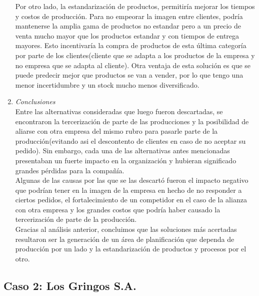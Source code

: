 \documentclass[a4paper,10pt]{article}
\begin{document}
\begin{enumerate}
Por otro lado, la estandarización de productos, permitiría mejorar los tiempos y costos de producción. Para no empeorar la imagen entre clientes, podría mantenerse la amplia gama de productos no estandar pero a un precio de venta mucho mayor que los productos estandar y con tiempos de entrega mayores. Esto incentivaría la compra de productos de esta última categoría por parte de los clientes(cliente que se adapta a los productos de la empresa y no empresa que se adapta al cliente). Otra ventaja de esta solución es que se puede predecir mejor que productos se van a vender, por lo que tengo una menor incertidumbre y un stock mucho menos diversificado.

			
			\item \textit{Conclusiones}\\
			Entre las alternativas consideradas que luego fueron descartadas, se encontraron la tercerización de parte de las producciones y la posibilidad de aliarse con otra empresa del mismo rubro para pasarle parte de la producción(evitando asi el descontento de clientes en caso de no aceptar su pedido). Sin embargo, cada una de las alternativas antes mencionadas presentaban un fuerte impacto en la organización y hubieran significado grandes pérdidas para la compañía.\\
			 Algunas de las causas por las que se las descartó fueron el impacto negativo que podrían tener en la imagen de la empresa en hecho de no responder a ciertos pedidos, el fortalecimiento de un competidor en el caso de la alianza con otra empresa y los grandes costos que podría haber causado la tercerización de parte de la producción.\\
			  Gracias al análisis anterior, concluimos que las soluciones más acertadas resultaron ser la generación de un área de planificación que dependa de producción por un lado y la estandarización de productos y procesos por el otro.
			
			\end{enumerate}
	\subsection{Caso 2: Los Gringos S.A.}
\end{document}
